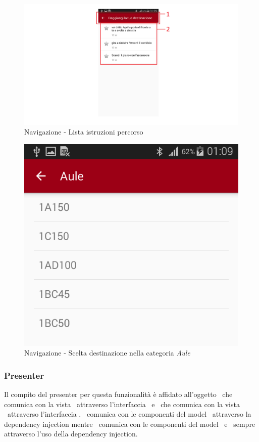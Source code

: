 \documentclass[../Funzionalita.tex]{subfiles}
\begin{document}
		\newpage	
		\vfill
			\begin{figure} [h]
				\centering
				\includegraphics[width=\textwidth]{img/Navigazione-NavigationView_}
				\caption{Navigazione - Lista istruzioni percorso}
				\label{fig:Navigazione-NavigationView}
			\end{figure}
			\vfill
			\begin{figure} [h]
				\centering
				\includegraphics[scale=0.3]{img/Navigazione-PoiCategoryView_}
				\caption{Navigazione - Scelta destinazione nella categoria \textit{Aule}}
				\label{fig:Navigazione-PoiCategoryView}
			\end{figure}
		\vfill
		
		
		\newpage
		\subsubsection{Presenter}
			Il compito del presenter per questa funzionalità è affidato all'oggetto \PoiCategoryActivity\ che comunica con la vista \PoiCategoryViewImp\ attraverso l'interfaccia \HomeView\ e \NavigationActivity\ che comunica con la vista \NavigationViewImp\ attraverso l'interfaccia \NavigationView. \PoiCategoryActivity\ comunica con le componenti del model \InformationManager\ attraverso la dependency injection mentre \NavigationActivity\ comunica con le componenti del model \InformationManager\ e \NavigationManager\ sempre attraverso l'uso della dependency injection.
		
\end{document}
